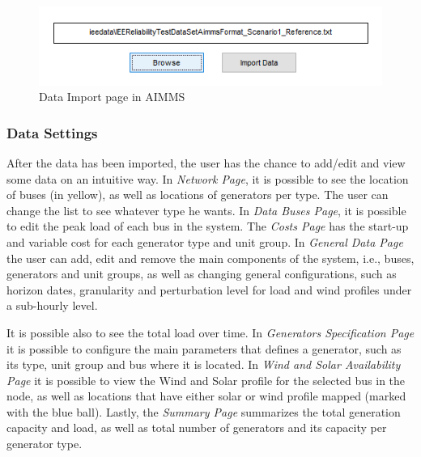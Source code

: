 \documentclass[12pt,LUDisStyle,twosided]{book}
\begin{document}
\begin{figure}[h] 
	\begin{center}
		\includegraphics[keepaspectratio]{aimmsScreenImportPage.png}
	  	\caption{Data Import page in AIMMS}
     	\label{fig:aimmsScreenImportPage}
	\end{center}
\end{figure}

\subsubsection{Data Settings}

After the data has been imported, the user has the chance to add/edit and view some data on an intuitive way. In \textit{Network Page}, it is possible to see the location of buses (in yellow), as well as locations of generators per type. The user can change the list to see whatever type he wants. In \textit{Data Buses Page}, it is possible to edit the peak load of each bus in the system. The \textit{Costs Page} has the start-up and variable cost for each generator type and unit group. In \textit{General Data Page} the user can add, edit and remove the main components of the system, i.e., buses, generators and unit groups, as well as changing general configurations, such as horizon dates, granularity and perturbation level for load and wind profiles under a sub-hourly level. 

It is possible also to see the total load over time. In \textit{Generators Specification Page} it is possible to configure the main parameters that defines a generator, such as its type, unit group and bus where it is located. In \textit{Wind and Solar Availability Page} it is possible to view the Wind and Solar profile for the selected bus in the node, as well as locations that have either solar or wind profile mapped (marked with the blue ball). Lastly, the \textit{Summary Page} summarizes the total generation capacity and load, as well as total number of generators and its capacity per generator type.
\end{document}
